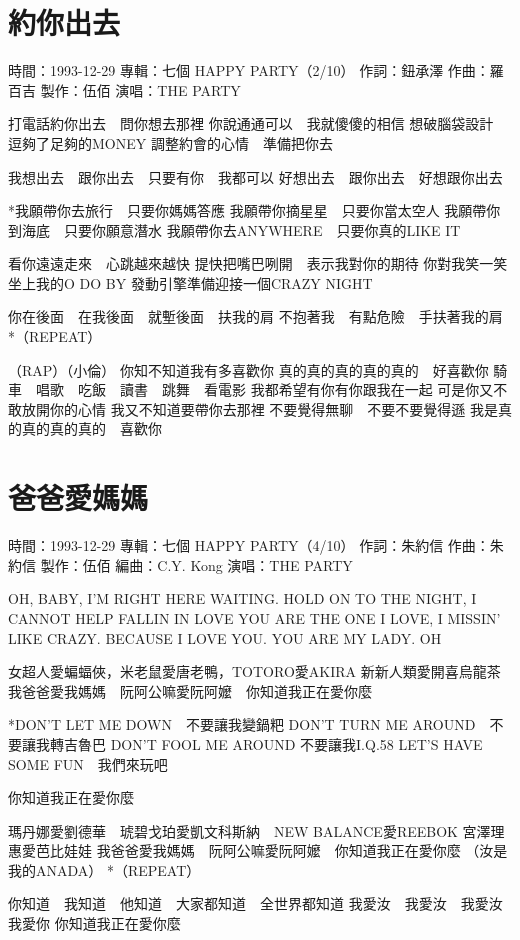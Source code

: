 \documentclass[UTF8,a4paper,oneside,twocolumn,12pt]{ctexbook}
\newcommand{\infopair}[2]{\textbullet #1：#2}
\newcommand{\zc}[1][伍佰]{\infopair{作詞}{#1}}
\newcommand{\zq}[1][伍佰]{\infopair{作曲}{#1}}
\newcommand{\bq}[1][伍佰]{\infopair{編曲}{#1}}
\newcommand{\zj}[1]{\infopair{專輯}{#1}}
\newcommand{\zz}[1]{\infopair{製作}{#1}}
\newcommand{\sj}[1]{\infopair{時間}{#1}}
\newenvironment{info}{\begin{flushleft}\kaishu
	}
	{\end{flushleft}\normalsize\yahei\par}
\newenvironment{lyric}{
	}
{}
\begin{document}
\section{約你出去}
\begin{info}
	\sj{1993-12-29}
	\zj{七個 HAPPY PARTY（2/10）}
	\zc[鈕承澤]
	\zq[羅百吉]
	\zz{伍佰}
	\infopair{演唱}{THE PARTY}
\end{info}
\begin{lyric}
	打電話約你出去　問你想去那裡
	你說通通可以　我就傻傻的相信
	想破腦袋設計　逗夠了足夠的MONEY
	調整約會的心情　準備把你去

	我想出去　跟你出去　只要有你　我都可以
	好想出去　跟你出去　好想跟你出去

	*我願帶你去旅行　只要你媽媽答應
	我願帶你摘星星　只要你當太空人
	我願帶你到海底　只要你願意潛水
	我願帶你去ANYWHERE　只要你真的LIKE IT

	看你遠遠走來　心跳越來越快
	提快把嘴巴咧開　表示我對你的期待
	你對我笑一笑　坐上我的O DO BY
	發動引擎準備迎接一個CRAZY NIGHT

	你在後面　在我後面　就塹後面　扶我的肩
	不抱著我　有點危險　手扶著我的肩
	*（REPEAT）

	（RAP）（小倫）
	你知不知道我有多喜歡你
	真的真的真的真的真的　好喜歡你
	騎車　唱歌　吃飯　讀書　跳舞　看電影
	我都希望有你有你跟我在一起
	可是你又不敢放開你的心情
	我又不知道要帶你去那裡
	不要覺得無聊　不要不要覺得遜
	我是真的真的真的真的　喜歡你
\end{lyric}

\section{爸爸愛媽媽}
\begin{info}
	\sj{1993-12-29}
	\zj{七個 HAPPY PARTY（4/10）}
	\zc[朱約信]
	\zq[朱約信]
	\zz{伍佰}
	\bq[C.Y. Kong]
	\infopair{演唱}{THE PARTY}
\end{info}
\begin{lyric}
	OH, BABY, I'M RIGHT HERE WAITING. HOLD ON TO
	THE NIGHT, I CANNOT HELP FALLIN IN LOVE
	YOU ARE THE ONE I LOVE, I MISSIN' LIKE CRAZY.
	BECAUSE I LOVE YOU.
	YOU ARE MY LADY. OH

	女超人愛蝙蝠俠，米老鼠愛唐老鴨，TOTORO愛AKIRA
	新新人類愛開喜烏龍茶
	我爸爸愛我媽媽　阮阿公嘛愛阮阿嬤　你知道我正在愛你麼

	*DON'T LET ME DOWN　不要讓我變鍋粑
	DON'T TURN ME AROUND　不要讓我轉吉魯巴
	DON'T FOOL ME AROUND 不要讓我I.Q.58
	LET'S HAVE SOME FUN　我們來玩吧

	你知道我正在愛你麼

	瑪丹娜愛劉德華　琥碧戈珀愛凱文科斯納　NEW BALANCE愛REEBOK
	宮澤理惠愛芭比娃娃
	我爸爸愛我媽媽　阮阿公嘛愛阮阿嬤　你知道我正在愛你麼
	（汝是我的ANADA）
	*（REPEAT）

	你知道　我知道　他知道　大家都知道　全世界都知道
	我愛汝　我愛汝　我愛汝　我愛你
	你知道我正在愛你麼
\end{lyric}
\end{document}
